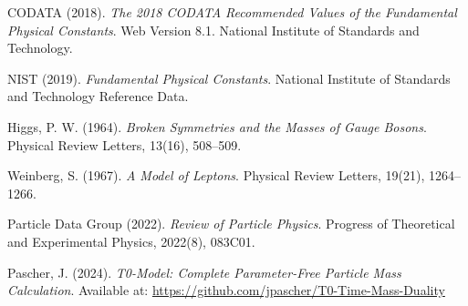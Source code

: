 \documentclass[12pt,a4paper]{article}
\theoremstyle{definition}
\begin{document}
	\newpage
	\begin{thebibliography}{99}
		
		CODATA (2018). \textit{The 2018 CODATA Recommended Values of the Fundamental Physical Constants}. 
		Web Version 8.1. National Institute of Standards and Technology.
		
		NIST (2019). \textit{Fundamental Physical Constants}. 
		National Institute of Standards and Technology Reference Data.
		
		Higgs, P. W. (1964). \textit{Broken Symmetries and the Masses of Gauge Bosons}. 
		Physical Review Letters, 13(16), 508–509.
		
		Weinberg, S. (1967). \textit{A Model of Leptons}. 
		Physical Review Letters, 19(21), 1264–1266.
		
		Particle Data Group (2022). \textit{Review of Particle Physics}. 
		Progress of Theoretical and Experimental Physics, 2022(8), 083C01.
		
		Pascher, J. (2024). \textit{T0-Model: Complete Parameter-Free Particle Mass Calculation}. 
		Available at: \url{https://github.com/jpascher/T0-Time-Mass-Duality}
		
	\end{thebibliography}
	
\end{document}
